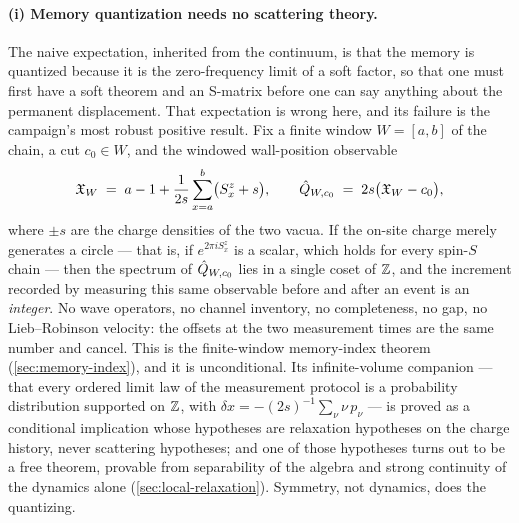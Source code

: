 \paragraph{(i) Memory quantization needs no scattering theory.}
The naive expectation, inherited from the continuum, is that the memory is
quantized because it is the zero-frequency limit of a soft factor, so that
one must first have a soft theorem and an S-matrix before one can say
anything about the permanent displacement. That expectation is wrong here,
and its failure is the campaign's most robust positive result. Fix a finite
window $W=[a,b]$ of the chain, a cut $c_0\in W$, and the windowed
wall-position observable
\begin{equation}
  \mathfrak{X}_W \;=\; a-1+\frac{1}{2s}\sum_{x=a}^{b}\bigl(S^z_x+s\bigr),
  \qquad
  \hat{Q}_{W,c_0} \;=\; 2s\bigl(\mathfrak{X}_W-c_0\bigr),
  \label{eq:ov-window-charge}
\end{equation}
where $\pm s$ are the charge densities of the two vacua. If the on-site
charge merely generates a circle --- that is, if $e^{2\pi i S^z_x}$ is a
scalar, which holds for every spin-$S$ chain --- then the spectrum of
$\hat{Q}_{W,c_0}$ lies in a single coset of $\mathbb{Z}$, and the increment recorded by
measuring this same observable before and after an event is an
\emph{integer}. No wave operators, no channel inventory, no completeness, no
gap, no Lieb--Robinson velocity: the offsets at the two measurement times are
the same number and cancel. This is the finite-window memory-index theorem
(\cref{sec:memory-index}), and it is unconditional. Its infinite-volume
companion --- that every ordered limit law of the measurement protocol is a
probability distribution supported on $\mathbb{Z}$, with
$\delta x=-(2s)^{-1}\sum_\nu \nu\,p_\nu$ --- is proved as a conditional
implication whose hypotheses are relaxation hypotheses on the charge history,
never scattering hypotheses; and one of those hypotheses turns out to be a
free theorem, provable from separability of the algebra and strong continuity
of the dynamics alone (\cref{sec:local-relaxation}). Symmetry, not dynamics,
does the quantizing.

